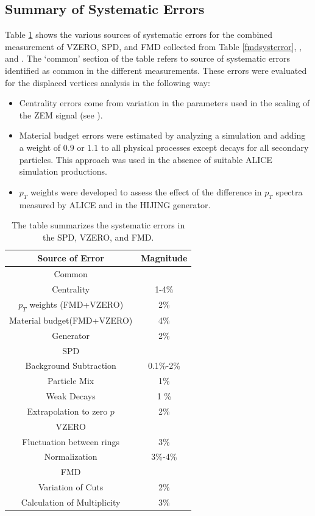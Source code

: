 \documentclass[11pt]{article}
\begin{document}
\subsection{Summary of Systematic Errors}
Table \ref{combinedsyst} shows the various sources of systematic
errors for the combined measurement of VZERO, SPD, and FMD collected
from Table \ref{fmdsysterror}, \cite{maxime}, and
\cite{ruben,Aamodt:2010cz}. The `common' section of the table refers to
source of systematic errors identified as common in the different
measurements. These errors were evaluated for the displaced vertices
analysis in the following way:
\begin{itemize}
\item Centrality errors come from variation in the parameters used in
  the scaling of the ZEM signal (see \cite{maxime}).
\item Material budget errors were estimated by analyzing a simulation
  and adding a weight of $0.9$ or $1.1$ to all physical processes except decays for all
  secondary particles. This approach was used in the absence of
  suitable ALICE simulation productions. 
\item $p_T$ weights were developed to assess the effect of the
  difference in $p_T$ spectra measured by ALICE and in the HIJING
  generator. 
\end{itemize}
\begin{table} 
\centering
\begin{tabular}{|c|c|}
\hline
Source of Error & Magnitude   \\
\hline
Common   &   \\
\hline
Centrality  & 1-4\%    \\
\hline
$p_T$ weights (FMD+VZERO)  & 2\%   \\
\hline
Material budget(FMD+VZERO)  & 4\%    \\
\hline
Generator  & 2\%    \\
\hline
SPD   &   \\
\hline
Background Subtraction & 0.1\%-2\%    \\
\hline
Particle Mix & 1\%   \\
\hline
Weak Decays & 1 \%   \\
\hline
Extrapolation to zero $p$ & 2\%    \\
\hline
VZERO &   \\
\hline
Fluctuation between rings & 3\%   \\
\hline
Normalization & 3\%-4\%   \\
\hline
FMD  &  \\
\hline
Variation of Cuts    &  2\%  \\
\hline
Calculation of Multiplicity    &  3\%  \\
\hline
\end{tabular}
\caption[Combined Systematic Errors]{The table summarizes the
  systematic errors in the SPD\cite{ruben,Aamodt:2010cz}, VZERO\cite{maxime}, and FMD\cite{hhd:2009}.} \label{combinedsyst} 
\end{table}
\end{document}
